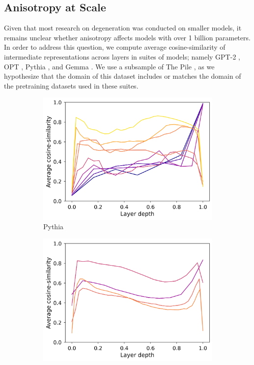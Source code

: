 \subsection{Anisotropy at Scale}
Given that most research on degeneration was conducted on smaller models, it remains unclear whether anisotropy affects models with over 1 billion parameters. In order to address this question, we compute average cosine-similarity of intermediate representations across layers in suites of models; namely GPT-2 \citep{radford2019language}, OPT \citep{zhang2022opt}, Pythia \citep{biderman2023pythia}, and Gemma \citep{gemmateam2024gemma}. We use a subsample of The Pile \citep{gao2020pile}, as we hypothesize that the domain of this dataset includes or matches the domain of the pretraining datasets used in these suites.

\begin{figure}[h]
    \centering
    \begin{subfigure}{0.33\columnwidth}
         \includegraphics[width=\linewidth]{sources/part_1/softmax_bottleneck/imgs/pythia_anisotropy.png}
         \caption{Pythia}
         \label{fig:pythia_aniso}
    \end{subfigure}
    \begin{subfigure}{0.33\columnwidth}
         \includegraphics[width=\linewidth]{sources/part_1/softmax_bottleneck/imgs/gpt2_anisotropy.png}

\end{subfigure}
\end{figure}
